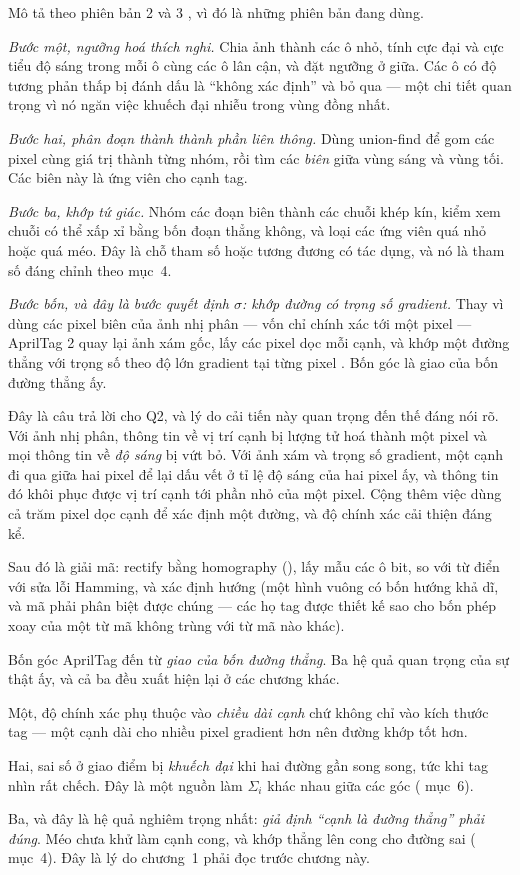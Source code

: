 \documentclass[../../marker.tex]{subfiles}
\begin{document}
Mô tả theo phiên bản 2 và 3 \cite{olson2011apriltag,wang2016apriltag2,krogius2019flexible}, vì đó là những phiên bản đang dùng.

\emph{Bước một, ngưỡng hoá thích nghi.} Chia ảnh thành các ô nhỏ, tính cực đại và cực tiểu độ sáng trong mỗi ô cùng các ô lân cận, và đặt ngưỡng ở giữa. Các ô có độ tương phản thấp bị đánh dấu là ``không xác định'' và bỏ qua --- một chi tiết quan trọng vì nó ngăn việc khuếch đại nhiễu trong vùng đồng nhất.

\emph{Bước hai, phân đoạn thành thành phần liên thông.} Dùng union-find để gom các pixel cùng giá trị thành từng nhóm, rồi tìm các \emph{biên} giữa vùng sáng và vùng tối. Các biên này là ứng viên cho cạnh tag.

\emph{Bước ba, khớp tứ giác.} Nhóm các đoạn biên thành các chuỗi khép kín, kiểm xem chuỗi có thể xấp xỉ bằng bốn đoạn thẳng không, và loại các ứng viên quá nhỏ hoặc quá méo. Đây là chỗ tham số  hoặc tương đương có tác dụng, và nó là tham số đáng chỉnh theo  mục~4.

\emph{Bước bốn, và đây là bước quyết định \(\sigma\): khớp đường có trọng số gradient.} Thay vì dùng các pixel biên của ảnh nhị phân --- vốn chỉ chính xác tới một pixel --- AprilTag 2 quay lại ảnh xám gốc, lấy các pixel dọc mỗi cạnh, và khớp một đường thẳng với trọng số theo độ lớn gradient tại từng pixel \cite{wang2016apriltag2}. Bốn góc là giao của bốn đường thẳng ấy.

Đây là câu trả lời cho Q2, và lý do cải tiến này quan trọng đến thế đáng nói rõ. Với ảnh nhị phân, thông tin về vị trí cạnh bị lượng tử hoá thành một pixel và mọi thông tin về \emph{độ sáng} bị vứt bỏ. Với ảnh xám và trọng số gradient, một cạnh đi qua giữa hai pixel để lại dấu vết ở tỉ lệ độ sáng của hai pixel ấy, và thông tin đó khôi phục được vị trí cạnh tới phần nhỏ của một pixel. Cộng thêm việc dùng cả trăm pixel dọc cạnh để xác định một đường, và độ chính xác cải thiện đáng kể.

Sau đó là giải mã: rectify bằng homography (), lấy mẫu các ô bit, so với từ điển với sửa lỗi Hamming, và xác định hướng (một hình vuông có bốn hướng khả dĩ, và mã phải phân biệt được chúng --- các họ tag được thiết kế sao cho bốn phép xoay của một từ mã không trùng với từ mã nào khác).

\begin{cannho}
Bốn góc AprilTag đến từ \emph{giao của bốn đường thẳng}. Ba hệ quả quan trọng của sự thật ấy, và cả ba đều xuất hiện lại ở các chương khác.

Một, độ chính xác phụ thuộc vào \emph{chiều dài cạnh} chứ không chỉ vào kích thước tag --- một cạnh dài cho nhiều pixel gradient hơn nên đường khớp tốt hơn.

Hai, sai số ở giao điểm bị \emph{khuếch đại} khi hai đường gần song song, tức khi tag nhìn rất chếch. Đây là một nguồn làm \(\Sigma_i\) khác nhau giữa các góc ( mục~6).

Ba, và đây là hệ quả nghiêm trọng nhất: \emph{giả định ``cạnh là đường thẳng'' phải đúng}. Méo chưa khử làm cạnh cong, và khớp thẳng lên cong cho đường sai ( mục~4). Đây là lý do chương~1 phải đọc trước chương này.
\end{cannho}
\end{document}
